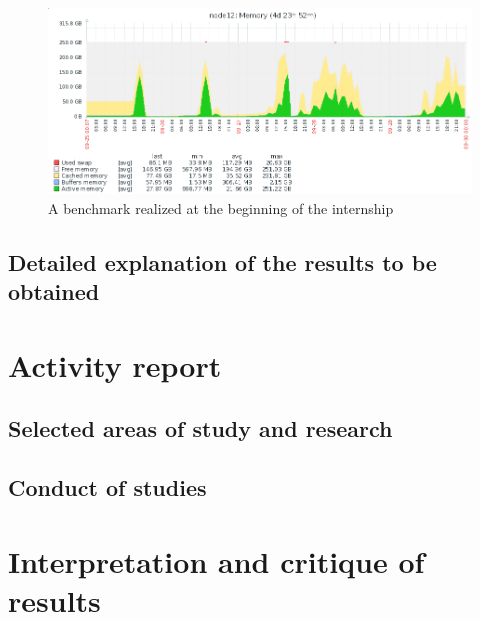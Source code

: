 \begin{figure}[H]
 \centering
 \includegraphics[scale=0.5]{img/over_memory.png}
 \caption{A benchmark realized at the beginning of the internship}
 \label{fig:over_memory}
\end{figure}

\subsection{Detailed explanation of the results to be obtained}


\section{Activity report}
\subsection{Selected areas of study and research}
\subsection{Conduct of studies}
\section{Interpretation and critique of results}